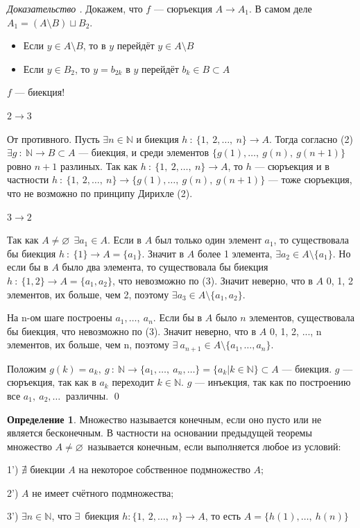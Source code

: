 \documentclass[12pt,oneside]{article}
\theoremstyle{definition}
\newtheorem{definition}{Определение}
\newenvironment{ourproof}[1]{\textit{Доказательство #1.}}{\qed}
\begin{document}
\begin{ourproof}{}
Докажем, что $f$ --- сюръекция $A\longrightarrow A_1$.
\newline
В самом деле $A_1=(A\setminus B)\sqcup B_2$. 
\begin{itemize}
    \item Если $y\in A\setminus B$, то в $y$ перейдёт $y\in A\setminus B$\checkmark
    \item Если $y\in B_2$, то $y=b_{2k}$ в $y$ перейдёт $b_k\in B\subset A$\checkmark
\end{itemize} 
$f$ --- биекция!

$2 \longrightarrow 3$

От противного. Пусть $\exists n\in \mathbb{N}$ и биекция $h\ :\ \{1,\ 2,\dots ,\ n\} \longrightarrow A$. Тогда согласно (2) $\exists g\ :\ \mathbb{N} \longrightarrow B\subset A$ --- биекция, и среди элементов $\{g(1),\dots ,\ g(n),\ g(n+1)\}$ ровно $n+1$ разлиных. Так как $h\ :\ \{1,\ 2,\dots ,\ n\} \longrightarrow A$, то $h$ --- сюръекция и в частности $h\ :\ \{1,\ 2,\dots ,\ n\} \longrightarrow \{g(1),\dots ,\ g(n),\ g(n+1)\}$ --- тоже сюръекция, что не возможно по принципу Дирихле (2).

$3 \longrightarrow 2$

Так как $A\neq \varnothing\ \ \exists a_1\in A$. Если в $A$ был только один элемент $a_1$, то существовала бы биекция $h\ :\ \{1\} \longrightarrow A=\{a_1\}$. Значит в $A$ более 1 элемента, $\exists a_2\in A\setminus\{a_1\}$. Но если бы в $A$ было два элемента, то существовала бы биекция $h\ :\ \{1,2\} \longrightarrow A=\{a_1, a_2\}$, что невозможно по (3). Значит неверно, что в $A$ 0, 1, 2 элементов, их больше, чем 2, поэтому $\exists a_3\in A\setminus\{a_1,a_2\}$.

На n-ом шаге построены $a_1,\dots ,\ a_n$. Если бы в $A$ было $n$ элементов, существовала бы биекция, что невозможно по (3). Значит неверно, что в $A$ 0, 1, 2, ..., n элементов, их больше, чем n, поэтому $\exists\ a_{n+1}\in A\setminus\{a_1,\dots , a_n\}$.

Положим $g(k)=a_k,\ g\ :\ \mathbb{N} \longrightarrow \{a_1,\dots ,\ a_n,\dots\} = \{a_k | k\in \mathbb{N}\}\subset A$ --- биекция. 
\newline
$g$ --- сюръекция, так как в $a_k$ переходит $k\in \mathbb{N}$.
\newline
$g$ --- инъекция, так как  по построению все $a_1,\ a_2,\dots\ $ различны.
\end{ourproof}

\begin{definition}
Множество называется конечным, если оно пусто или не является бесконечным. В частности на основании предыдущей теоремы множество $A\neq \varnothing$\ называется конечным, если выполняется любое из условий:

1') $\nexists$ биекции $A$ на некоторое собственное подмножество $A$;

2') $A$ не имеет счётного подмножества;

3') $\exists n\in\mathbb{N}$, что $\exists $\ биекция $h : \{1,\ 2,\dots ,\ n\} \longrightarrow A$, то есть $A=\{h(1),\dots ,\ h(n)\}$
\end{definition}
\end{document}
